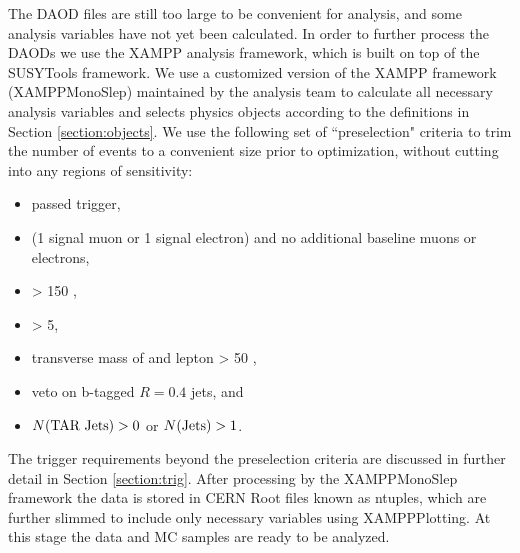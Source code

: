 The DAOD files are still too large to be convenient for analysis, and some analysis variables have not yet been calculated. In order to further process the DAODs we use the XAMPP analysis framework, which is built on top of the SUSYTools framework. We use a customized version of the XAMPP framework (XAMPPMonoSlep) maintained by the analysis team to calculate all necessary analysis variables and selects physics objects according to the definitions in Section \ref{section:objects}. We use the following set of ``preselection" criteria to trim the number of events to a convenient size prior to optimization, without cutting into any regions of sensitivity:
\begin{itemize}
\item passed \met trigger,
\item (1 signal muon or 1 signal electron) and no additional baseline muons or electrons,
\item \met > 150 \GeV,
\item \metsig > 5,
\item transverse mass of \met and lepton \mtlepmet > 50 \GeV,
\item veto on b-tagged $R=0.4$ jets, and
\item \(N (\text{TAR Jets}) > 0\) or \(N (\text{Jets}) > 1\).
\end{itemize}

The trigger requirements beyond the preselection criteria are discussed in further detail in Section \ref{section:trig}.  After processing by the XAMPPMonoSlep framework the data is stored in CERN Root files known as ntuples, which are further slimmed to include only necessary variables using XAMPPPlotting. At this stage the data and MC samples are ready to be analyzed.
